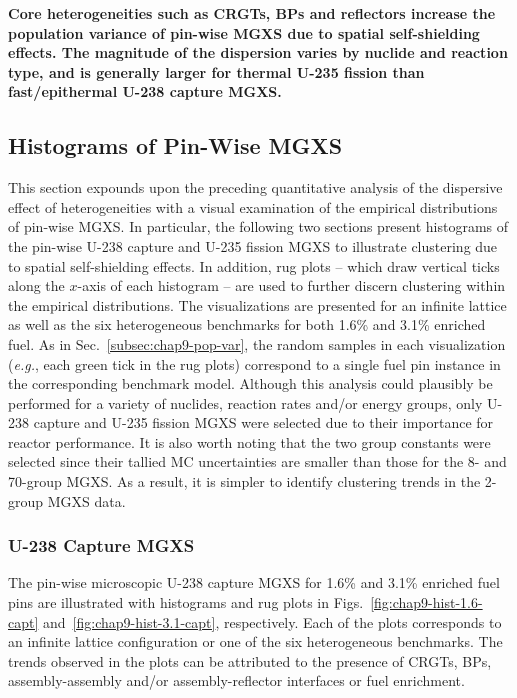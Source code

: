 \begin{emphbox}
\textbf{Core heterogeneities such as \acp{CRGT}, \acp{BP} and reflectors increase the population variance of pin-wise \ac{MGXS} due to spatial self-shielding effects. The magnitude of the dispersion varies by nuclide and reaction type, and is generally larger for thermal U-235 fission than fast/epithermal U-238 capture \ac{MGXS}.}
\end{emphbox}

\subsection{Histograms of Pin-Wise MGXS}
\label{subsec:chap9-histograms}

This section expounds upon the preceding quantitative analysis of the dispersive effect of heterogeneities with a visual examination of the empirical distributions of pin-wise \ac{MGXS}. In particular, the following two sections present histograms of the pin-wise U-238 capture and U-235 fission \ac{MGXS} to illustrate clustering due to spatial self-shielding effects. In addition, rug plots -- which draw vertical ticks along the $x$-axis of each histogram -- are used to further discern clustering within the empirical distributions. The visualizations are presented for an infinite lattice as well as the six heterogeneous benchmarks for both 1.6\% and 3.1\% enriched fuel. As in Sec.~\ref{subsec:chap9-pop-var}, the random samples in each visualization (\textit{e.g.}, each green tick in the rug plots) correspond to a single fuel pin instance in the corresponding benchmark model. Although this analysis could plausibly be performed for a variety of nuclides, reaction rates and/or energy groups, only U-238 capture and U-235 fission \ac{MGXS} were selected due to their importance for reactor performance. It is also worth noting that the two group constants were selected since their tallied \ac{MC} uncertainties are smaller than those for the 8- and 70-group \ac{MGXS}. As a result, it is simpler to identify clustering trends in the 2-group \ac{MGXS} data.

\subsubsection{U-238 Capture MGXS}
\label{subsubsec:chap9-histograms-capt}

The pin-wise microscopic U-238 capture \ac{MGXS} for 1.6\% and 3.1\% enriched fuel pins are illustrated with histograms and rug plots in Figs.~\ref{fig:chap9-hist-1.6-capt} and~\ref{fig:chap9-hist-3.1-capt}, respectively. Each of the plots corresponds to an infinite lattice configuration or one of the six heterogeneous benchmarks. The trends observed in the plots can be attributed to the presence of \acp{CRGT}, \acp{BP}, assembly-assembly and/or assembly-reflector interfaces or fuel enrichment. 


